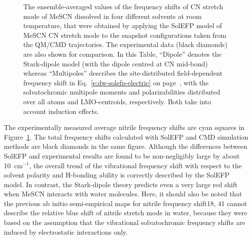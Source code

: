 \documentclass[a4paper,titlepage,twoside,fleqn,12pt]{book}
\begin{document}
\begin{refsection}
%
\begin{figure}[t!]
\centering
\setlength\fboxsep{0.4pt}
\setlength\fboxrule{0.5pt}
\caption{
The ensemble\hyp{}averaged values of the frequency shifts of CN stretch mode of MeSCN dissolved in four
different solvents at room temperature, that were obtained by applying the SolEFP model of MeSCN CN
stretch mode to the snapshot configurations taken from the QM/CMD trajectories. The experimental data (black
diamonds) are also shown for comparison. In this Table, ``Dipole'' denotes the Stark\hyp{}dipole model (with the
dipole centred at CN mid\hyp{}bond) whereas ``Multipoles'' describes the site\hyp{}distributed field\hyp{}dependent
frequency shift in Eq.~\ref{e:dw-solefp-electric} on page~\pageref{e:dw-solefp-electric}, 
with the solvatochromic multipole moments and polarizabilities distributed over
all atoms and LMO\hyp{}centroids, respectively. Both take into account induction effects.
\label{t:mescn-solefp-md-exp}}
\end{figure}
%
The experimentally measured average nitrile frequency
shifts are cyan squares in Figure~\ref{t:mescn-solefp-md-exp}. 
The total frequency shifts
calculated with SolEFP and CMD simulation methods are black
diamonds in the same figure. Although the differences
between SolEFP and experimental results are found to be non-negligibly
large by about 10~cm$^{-1}$, the overall trend of the
vibrational frequency shift with respect to the solvent polarity
and H-bonding ability is correctly described by the SolEFP
model. In contrast, the Stark\hyp{}dipole theory predicts even a
very large red shift when MeSCN interacts with water
molecules. Here, it should also be noted that the previous ab
initio semi\hyp{}empirical maps for nitrile frequency shift18, 41
cannot describe the relative blue shift of nitrile stretch mode
in water, because they were based on the assumption that the
vibrational solvatochromic frequency shifts are induced by
electrostatic interactions only.


\end{refsection}
\end{document}

